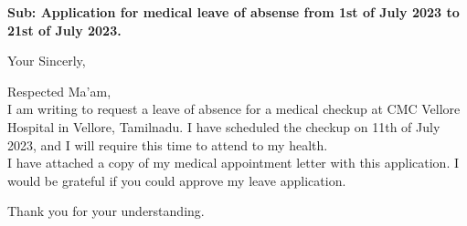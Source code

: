 \documentclass[11pt,a4paper,roman]{moderncv}
\begin{document}
\date{\today}

\opening{\textbf{Sub: Application for medical leave of absense from 1st of July 2023 to 21st of July 2023.}}
\closing{Your Sincerly, \vspace{-1em}}



\makelettertitle



Respected Ma'am,
\\
\vspace{1em}
I am writing to request a leave of absence for a medical checkup at CMC Vellore Hospital in Vellore, Tamilnadu. I have scheduled the checkup on 11th of July 2023, and I will require this time to attend to my health.\\

\vspace{1em}
I have attached a copy of my medical appointment letter with this application. I would be grateful if you could approve my leave application. \\
\vspace{1em}





Thank you for your understanding.
\vspace{0.5cm}


\makeletterclosing
\end{document}
